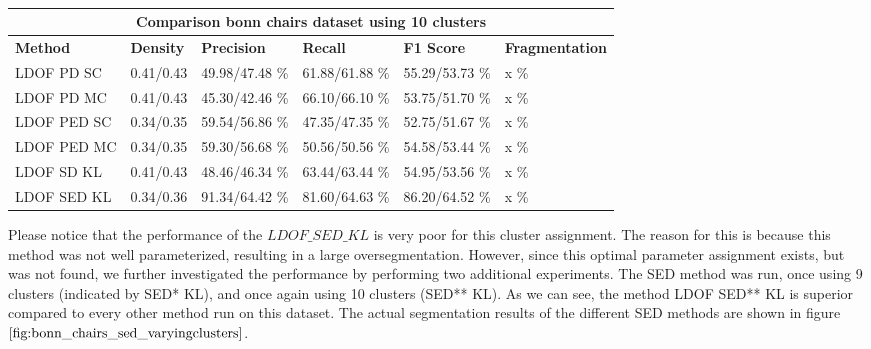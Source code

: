 \begin{table}[H]
\centering
\begin{tabular}{|l|l|l|l|l|l|}
\hline
\multicolumn{6}{|c|}{Comparison bonn chairs dataset using 10 clusters}                        \\ \hline
\textbf{Method} & \textbf{Density} & \textbf{Precision} & \textbf{Recall} & \textbf{F1 Score} & \textbf{Fragmentation} \\ \hline
LDOF PD SC & 0.41/0.43 & 49.98/47.48 \%   & 61.88/61.88 \%     & 55.29/53.73 \%  & x \% \\ \hline
LDOF PD MC & 0.41/0.43 & 45.30/42.46 \%   & 66.10/66.10 \%     & 53.75/51.70 \%  & x \%   \\ \hline
LDOF PED SC & 0.34/0.35& 59.54/56.86 \%   & 47.35/47.35 \%     & 52.75/51.67 \%  & x \%   \\ \hline
LDOF PED MC & 0.34/0.35 & 59.30/56.68 \%   & 50.56/50.56 \%     & 54.58/53.44 \%  & x \%   \\ \hline              
LDOF SD KL & 0.41/0.43 & 48.46/46.34 \%   & 63.44/63.44 \%     & 54.95/53.56 \%  & x \%   \\ \hline
LDOF SED KL & 0.34/0.36 & 91.34/64.42 \%   & 81.60/64.63 \%     & 86.20/64.52 \%    & x \%  \\ \hline
\end{tabular}
\caption[Bonn Chairs Merged 10 Clusters]{}
\label{tab:eval_bonn_chairs_c_10}
\end{table}





Please notice that the performance of the $\textit{LDOF\_SED\_KL}$ is very poor for this cluster assignment. The reason for this is because this method was not well parameterized, resulting in a large oversegmentation. However, since this optimal parameter assignment exists, but was not found, we further investigated the performance by performing two additional experiments. The SED method was run, once using 9 clusters (indicated by SED* KL), and once again using 10 clusters (SED** KL). As we can see, the method LDOF SED** KL is superior compared to every other method run on this dataset. The actual segmentation results of the different SED methods are shown in figure $\ref{fig:bonn_chairs_sed_varyingclusters}$.






